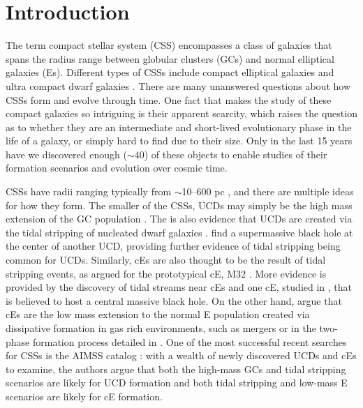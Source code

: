 \documentclass[iop,apj]{emulateapj}
\begin{document}
\maketitle

\section{Introduction}
\label{intro}

\noindent The term compact stellar system (CSS) encompasses a class of galaxies that spans the radius range between globular clusters (GCs) and normal elliptical galaxies (Es). Different types of CSSs include compact elliptical galaxies \citep[cEs;][]{Faber1973} and ultra compact dwarf galaxies \citep[UCDs;][]{Phillipps2001}. There are many unanswered questions about how CSSs form and evolve through time. One fact that makes the study of these compact galaxies so intriguing is their apparent scarcity, which raises the question as to whether they are an intermediate and short-lived evolutionary phase in the life of a galaxy, or simply hard to find due to their size. Only in the last 15 years have we discovered enough ($\sim 40$) of these objects to enable studies of their formation scenarios and evolution over cosmic time.

CSSs have radii ranging typically from $\sim$10--600 pc \citep[e.g.,][]{Norris2014}, and there are multiple ideas for how they form. The smaller of the CSSs, UCDs may simply be the high mass extension of the GC population \citep{Drinkwater2000, Mieske2002}. The is also evidence that UCDs are created via the tidal stripping of nucleated dwarf galaxies \citep{Bekki2001, Bekki2003, Jennings2015, Zhang2015}. \citet{Seth2014} find a supermassive black hole at the center of another UCD, providing further evidence of tidal stripping being common for UCDs. Similarly, cEs are also thought to be the result of tidal stripping events, as argued for the prototypical cE, M32 \citep{Choi2002, Graham2002, Huxor2011}. More evidence is provided by the discovery of tidal streams near cEs \citep{SmithCastelli2008a,Chilingarian2009} and one cE, studied in \citet{Kormendy1997}, that is believed to host a central massive black hole. On the other hand, \citet{Wirth1984,Kormendy2009,Kormendy2012a} argue that cEs are the low mass extension to the normal E population created via dissipative formation in gas rich environments, such as mergers or in the two-phase formation process detailed in \citet{Oser2010}. One of the most successful recent searches for CSSs is the AIMSS catalog \citep{Norris2014}: with a wealth of newly discovered UCDs and cEs to examine, the authors argue that both the high-mass GCs and tidal stripping scenarios are likely for UCD formation and both tidal stripping and low-mass E scenarios are likely for cE formation.
\end{document}
